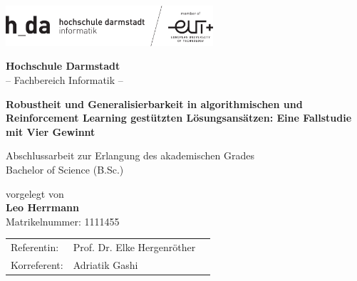 \thispagestyle{empty}
\begin{titlepage}
 \begin{center}
    \includegraphics[width=7.7cm]{logo_h-da_neu} \\ 
  \end{center}

  \begin{center}
    \vspace{0.1cm}
    \huge \textbf{Hochschule Darmstadt}\\
    \vspace{0.4cm}
    \LARGE -- Fachbereich Informatik --
  \end{center}

  \vfill
  \vfill

  \begin{center}
    \LARGE \textbf{Robustheit und Generalisierbarkeit in algorithmischen und Reinforcement Learning gestützten Lösungsansätzen: Eine Fallstudie mit Vier Gewinnt}
  \end{center} 
  
  \vfill
  \vfill

  \begin{center}
	\Large Abschlussarbeit zur Erlangung des akademischen Grades\\
	\vspace{0.3cm}
	\Large Bachelor of Science (B.Sc.)\\
  \end{center}

  \vfill

  \begin{center}
    \Large vorgelegt von\\
    \vspace{0.3cm}
    \Large \textbf{Leo Herrmann}\\
    \vspace{0.3cm}
    \normalsize Matrikelnummer: 1111455
  \end{center}
    \vfill
  \vfill

  \begin{center}
    \begin{tabular}{lll}
      Referentin:    & Prof. Dr. Elke Hergenröther \\
      Korreferent: & Adriatik Gashi				 \\
    \end{tabular}
  \end{center} 
\end{titlepage}
